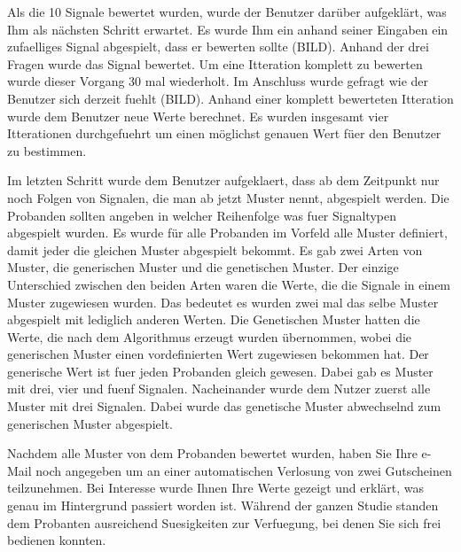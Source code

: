 Als die 10 Signale bewertet wurden, wurde der Benutzer darüber aufgeklärt, was Ihm als nächsten Schritt erwartet. Es wurde Ihm ein anhand seiner Eingaben ein zufaelliges Signal abgespielt, dass er bewerten sollte (BILD). Anhand der drei Fragen wurde das Signal bewertet. Um eine Itteration komplett zu bewerten wurde dieser Vorgang 30 mal wiederholt. Im Anschluss wurde gefragt wie der Benutzer sich derzeit fuehlt (BILD). Anhand einer komplett bewerteten Itteration wurde dem Benutzer neue Werte berechnet. Es wurden insgesamt vier Itterationen durchgefuehrt um einen möglichst genauen Wert füer den Benutzer zu bestimmen.

Im letzten Schritt wurde dem Benutzer aufgeklaert, dass ab dem Zeitpunkt nur noch Folgen von Signalen, die man ab jetzt Muster nennt, abgespielt werden. Die Probanden sollten angeben in welcher Reihenfolge was fuer Signaltypen abgespielt wurden. Es wurde für alle Probanden im Vorfeld alle Muster definiert, damit jeder die gleichen Muster abgespielt bekommt. Es gab zwei Arten von Muster, die generischen Muster und die genetischen Muster. Der einzige Unterschied zwischen den beiden Arten waren die Werte, die die Signale in einem Muster zugewiesen wurden. Das bedeutet es wurden zwei mal das selbe Muster abgespielt mit lediglich anderen Werten. Die Genetischen Muster hatten die Werte, die nach dem Algorithmus erzeugt wurden übernommen, wobei die generischen Muster einen vordefinierten Wert zugewiesen bekommen hat. Der generische Wert ist fuer jeden Probanden gleich gewesen.
Dabei gab es Muster mit drei, vier und fuenf Signalen. Nacheinander wurde dem Nutzer zuerst alle Muster mit drei Signalen. Dabei wurde das genetische Muster abwechselnd zum generischen Muster abgespielt. 

Nachdem alle Muster von dem Probanden bewertet wurden, haben Sie Ihre e-Mail noch angegeben um an einer automatischen Verlosung von zwei Gutscheinen teilzunehmen. Bei Interesse wurde Ihnen Ihre Werte gezeigt und erklärt, was genau im Hintergrund passiert worden ist. Während der ganzen Studie standen dem Probanten ausreichend Suesigkeiten zur Verfuegung, bei denen Sie sich frei bedienen konnten.